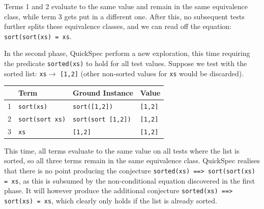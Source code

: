 \noindent Terms 1 and 2 evaluate to the same value and remain in the same equivalence class, while term 3 gets put in a different one.
After this, no subsequent tests further splits these equivalence classes, and we can read off the equation: \texttt{sort(sort(xs) = xs}.

In the second phase, QuickSpec perform a new exploration, this time requiring the predicate \texttt{sorted(xs)} to hold for all test values. Suppose we test with the sorted list: \texttt{xs}$ \rightarrow$ \texttt{[1,2]} (other non-sorted values for \texttt{xs} would be discarded).       

\begin{tabularx}{\textwidth}{l  X  X  X}
 & Term & Ground Instance & Value \\
 \hline
1 \quad &\texttt{sort(xs)} & \texttt{sort([1,2])} & \texttt{[1,2]} \\
2 \quad&\texttt{sort(sort xs)} &\texttt{sort(sort [1,2])} & \texttt{[1,2]}\\
3 \quad &\texttt{xs} &\texttt{[1,2]} & \texttt{[1,2]} \\
\end{tabularx}

\noindent This time, all terms evaluate to the same value on all tests where the list is sorted, so all three terms remain in the same equivalence class. QuickSpec realises that there is no point producing the conjecture \texttt{sorted(xs) ==> sort(sort(xs) = xs}, as this is subsumed by the non-conditional equation discovered in the first phase. It will however produce the additional conjecture \texttt{sorted(xs) ==> sort(xs) = xs}, which clearly only holds if the list is already sorted.